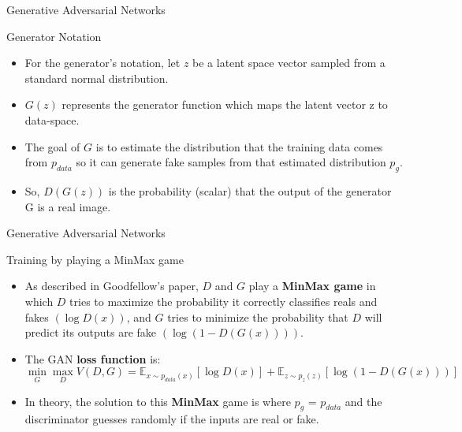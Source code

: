 \documentclass[10pt]{beamer}
\begin{document}
{
\begin{frame}{Generative Adversarial Networks}
      \begin{block}{Generator Notation}
	\begin{itemize}[<+- | alert@+>]
    \item For the generator’s notation, let $z$ be a latent space vector sampled from a standard normal distribution.
    \item $G(z)$ represents the generator function which maps the latent vector z to data-space. 
    \item The goal of $G$ is to estimate the distribution that the training data comes from $p_{data}$ so it can generate fake samples from that estimated distribution $p_g$.
    \item So, $D(G(z))$ is the probability (scalar) that the output of the generator G is a real image.
  \end{itemize}
    \end{block}
\end{frame}
}
{
\begin{frame}{Generative Adversarial Networks}
      \begin{block}{Training by playing a MinMax game}
	\begin{itemize}[<+- | alert@+>]
    \item As described in Goodfellow’s paper, $D$ and $G$ play a \textbf{MinMax game} in which $D$ tries to maximize the probability it correctly classifies reals and fakes $(\log D(x))$, and $G$ tries to minimize the probability that $D$ will predict its outputs are fake $(\log (1 - D(G(x)) ))$.
    \item The GAN \textbf{loss function} is:
    $$\min_G \max_D V(D,G) = \mathbb{E}_{x \sim p_{data}(x)}[\log D(x)]+\mathbb{E}_{z \sim p_z(z)}[\log(1−D(G(x)))]$$
    \item In theory, the solution to this \textbf{MinMax} game is where $p_g$ = $p_{data}$
    and the discriminator guesses randomly if the inputs are real or fake. 
  \end{itemize}
    \end{block}
\end{frame}
}
\end{document}
